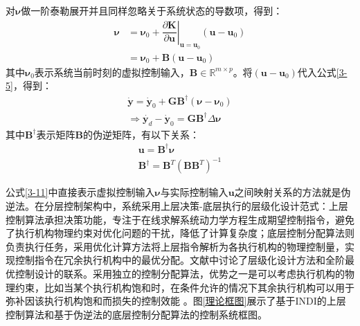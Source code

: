对$\boldsymbol{\nu}$做一阶泰勒展开并且同样忽略关于系统状态的导数项，得到：
\begin{equation}
    \begin{aligned}
    \boldsymbol{\nu} &= \boldsymbol{\nu}_0 +  \left.\dfrac{\partial \boldsymbol{K}}{\partial \boldsymbol{u}}\right|_{\boldsymbol{u}=\boldsymbol{u}_0}(\boldsymbol{u}-\boldsymbol{u}_0)\\
        &= \boldsymbol{\nu}_0 + \boldsymbol{B}(\boldsymbol{u}-\boldsymbol{u}_0)
    \end{aligned}
    \label{3-9}
\end{equation}
其中$\boldsymbol{\nu}_0$表示系统当前时刻的虚拟控制输入，$\boldsymbol{B}\in\mathbb{R}^{m\times p}$。将$(\boldsymbol{u}-\boldsymbol{u}_0)$代入公式\eqref{3-5}，得到：
\begin{equation}
    \begin{aligned}
    \dot{\boldsymbol{y}}=\dot{\boldsymbol{y}}_0+\boldsymbol{G}\boldsymbol{B}^\dagger(\boldsymbol{\nu}-\boldsymbol{\nu}_0)\\
    \Rightarrow \dot{\boldsymbol{y}_d}-\dot{\boldsymbol{y}}_0 = \boldsymbol{G}\boldsymbol{B}^\dagger\Delta\boldsymbol{\nu}
    \label{3-10}
    \end{aligned}
\end{equation}
其中$\boldsymbol{B}^\dagger$表示矩阵$\boldsymbol{B}$的伪逆矩阵，有以下关系：
\begin{gather}
    \boldsymbol{u}=\boldsymbol{B}^\dagger\boldsymbol{\nu}    \label{3-11}
    \\ 
    \boldsymbol{B}^\dagger=\boldsymbol{B}^T\left(\boldsymbol{B}\boldsymbol{B}^T\right)^{-1}    \label{3-12}
\end{gather}

公式\eqref{3-11}中直接表示虚拟控制输入$\boldsymbol{\nu}$与实际控制输入$\boldsymbol{u}$之间映射关系的方法就是伪逆法。在分层控制架构中，系统采用上层决策-底层执行的层级化设计范式：上层控制算法承担决策功能，专注于在线求解系统动力学方程生成期望控制指令，避免了执行机构物理约束对优化问题的干扰，降低了计算复杂度；底层控制分配算法则负责执行任务，采用优化计算方法将上层指令解析为各执行机构的物理控制量，实现控制指令在冗余执行机构中的最优分配。文献\parencite{harkegardResolvingActuatorRedundancy2005}中讨论了层级化设计方法和全阶最优控制设计的联系。采用独立的控制分配算法，优势之一是可以考虑执行机构的物理约束，比如当某个执行机构饱和时，在条件允许的情况下其余执行机构可以用于弥补因该执行机构饱和而损失的控制效能 。图\ref{理论框图}展示了基于INDI的上层控制算法和基于伪逆法的底层控制分配算法的控制系统框图。

